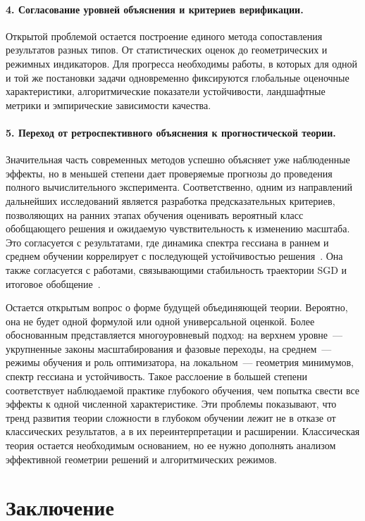 \paragraph{4. Согласование уровней объяснения и критериев верификации.}
Открытой проблемой остается построение единого метода сопоставления результатов разных типов.
От статистических оценок до геометрических и режимных индикаторов.
Для прогресса необходимы работы, в которых для одной и той же постановки задачи одновременно фиксируются глобальные оценочные характеристики, алгоритмические показатели устойчивости, ландшафтные метрики и эмпирические зависимости качества.

\paragraph{5. Переход от ретроспективного объяснения к прогностической теории.}
Значительная часть современных методов успешно объясняет уже наблюденные эффекты, но в меньшей степени дает проверяемые прогнозы до проведения полного вычислительного эксперимента.
Соответственно, одним из направлений дальнейших исследований является разработка предсказательных критериев, позволяющих на ранних этапах обучения оценивать вероятный класс обобщающего решения и ожидаемую чувствительность к изменению масштаба.
Это согласуется с результатами, где динамика спектра гессиана в раннем и среднем обучении коррелирует с последующей устойчивостью решения~\cite{hessian2019sgd,hessianpowerlaw2022}.
Она также согласуется с работами, связывающими стабильность траектории SGD и итоговое обобщение~\cite{sgdstability2023,sgd2020stability}.

Остается открытым вопрос о форме будущей объединяющей теории.
Вероятно, она не будет одной формулой или одной универсальной оценкой.
Более обоснованным представляется многоуровневый подход: на верхнем уровне~--- укрупненные законы масштабирования и фазовые переходы, на среднем~--- режимы обучения и роль оптимизатора, на локальном~--- геометрия минимумов, спектр гессиана и устойчивость.
Такое расслоение в большей степени соответствует наблюдаемой практике глубокого обучения, чем попытка свести все эффекты к одной численной характеристике.
Эти проблемы показывают, что тренд развития теории сложности в глубоком обучении лежит не в отказе от классических результатов, а в их переинтерпретации и расширении.
Классическая теория остается необходимым основанием, но ее нужно дополнять анализом эффективной геометрии решений и алгоритмических режимов.

\section{Заключение}

